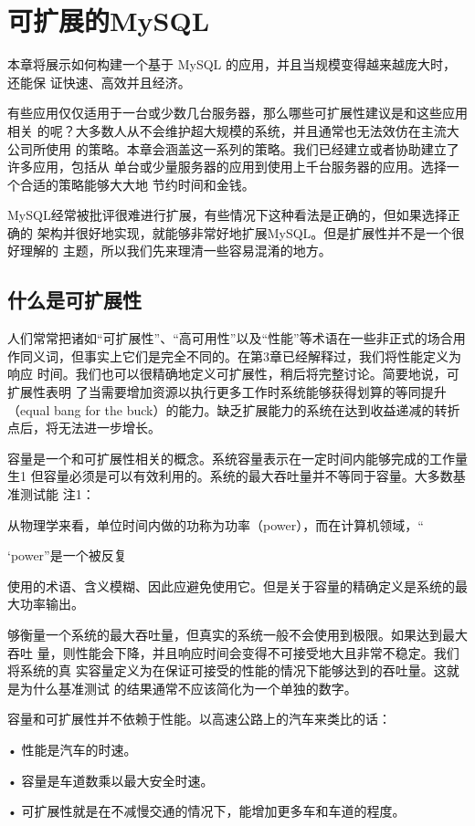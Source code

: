 \chapter{可扩展的MySQL}
本章将展示如何构建一个基于 MySQL 的应用，并且当规模变得越来越庞大时，还能保
证快速、高效并且经济。

有些应用仅仅适用于一台或少数几台服务器，那么哪些可扩展性建议是和这些应用相关
的呢？大多数人从不会维护超大规模的系统，并且通常也无法效仿在主流大公司所使用
的策略。本章会涵盖这一系列的策略。我们已经建立或者协助建立了许多应用，包括从
单台或少量服务器的应用到使用上千台服务器的应用。选择一个合适的策略能够大大地
节约时间和金钱。

MySQL经常被批评很难进行扩展，有些情况下这种看法是正确的，但如果选择正确的
架构并很好地实现，就能够非常好地扩展MySQL。但是扩展性并不是一个很好理解的
主题，所以我们先来理清一些容易混淆的地方。

\section{什么是可扩展性}
人们常常把诸如“可扩展性”、“高可用性”以及“性能”等术语在一些非正式的场合用
作同义词，但事实上它们是完全不同的。在第3章已经解释过，我们将性能定义为响应
时间。我们也可以很精确地定义可扩展性，稍后将完整讨论。简要地说，可扩展性表明
了当需要增加资源以执行更多工作时系统能够获得划算的等同提升 （equal bang for the
buck）的能力。缺乏扩展能力的系统在达到收益递减的转折点后，将无法进一步增长。

容量是一个和可扩展性相关的概念。系统容量表示在一定时间内能够完成的工作量生1
但容量必须是可以有效利用的。系统的最大吞吐量并不等同于容量。大多数基准测试能
注1：

从物理学来看，单位时间内做的功称为功率（power），而在计算机领域，“

‘power”是一个被反复

使用的术语、含义模糊、因此应避免使用它。但是关于容量的精确定义是系统的最大功率输出。

够衡量一个系统的最大吞吐量，但真实的系统一般不会使用到极限。如果达到最大吞吐
量，则性能会下降，并且响应时间会变得不可接受地大且非常不稳定。我们将系统的真
实容量定义为在保证可接受的性能的情况下能够达到的吞吐量。这就是为什么基准测试
的结果通常不应该简化为一个单独的数字。

容量和可扩展性并不依赖于性能。以高速公路上的汽车来类比的话：

• 性能是汽车的时速。

• 容量是车道数乘以最大安全时速。

• 可扩展性就是在不减慢交通的情况下，能增加更多车和车道的程度。

